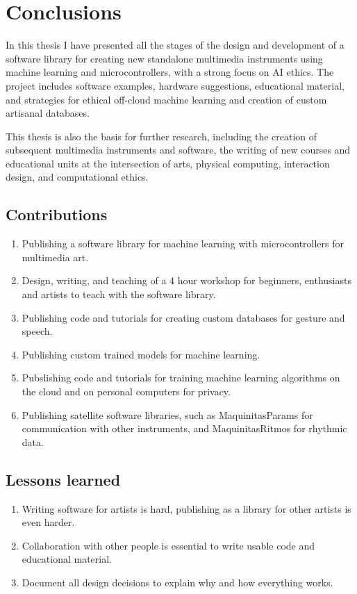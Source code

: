 \chapter{Conclusions}

In this thesis I have presented all the stages of the design and development of a software library for creating new standalone multimedia instruments using machine learning and microcontrollers, with a strong focus on AI ethics. The project includes software examples, hardware suggestions, educational material, and strategies for ethical off-cloud machine learning and creation of custom artisanal databases.

This thesis is also the basis for further research, including the creation of subsequent multimedia instruments and software, the writing of new courses and educational units at the intersection of arts, physical computing, interaction design, and computational ethics.

\section{Contributions}

\begin{enumerate}
  \item Publishing a software library for machine learning with microcontrollers for multimedia art.
  \item Design, writing, and teaching of a 4 hour workshop for beginners, enthusiasts and artists to teach with the software library.
  \item Publishing code and tutorials for creating custom databases for gesture and speech.
  \item Publishing custom trained models for machine learning.
  \item Pubslishing code and tutorials for training machine learning algorithms on the cloud and on personal computers for privacy.
  \item Publishing satellite software libraries, such as MaquinitasParams for communication with other instruments, and MaquinitasRitmos for rhythmic data.
\end{enumerate}

\section{Lessons learned}

\begin{enumerate}
  \item Writing software for artists is hard, publishing as a library for other artists is even harder.
  \item Collaboration with other people is essential to write usable code and educational material.
  \item Document all design decisions to explain why and how everything works.
\end{enumerate}

